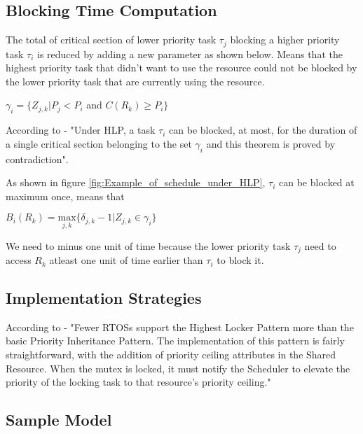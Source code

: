 \subsection{Blocking Time Computation}

The total of critical section of lower priority task $\tau_{j}$ blocking a higher priority task $\tau_{i}$ is reduced by adding a new parameter as shown below. Means that the highest priority task that didn't want to use the resource could not be blocked by the lower priority task that are currently using the resource.

\begin{center}
$ \gamma_{i}=\{Z_{j,k} | P_{j}<P_{i} $ and $ C(R_{k})\geq P_{i} \} $ \cite{b5}
\end{center}

According to \cite{b5} - "Under HLP, a task $ \tau_{i} $ can be blocked, at most, for the duration of a single critical section belonging to the set $ \gamma_{i} $ and this theorem is proved by contradiction".  

As shown in figure \ref{fig:Example_of_schedule_under_HLP}, $ \tau_{i} $ can be blocked at maximum once, means that

\begin{center}
$B_{i}(R_{k})=\underset{j,k}{\mathrm{max}} \{ \delta_{j,k}-1 | Z_{j,k} \in \gamma_{i}\}  $ \cite{b5}
\end{center}

We need to minus one unit of time because the lower priority task $ \tau_{j} $ need to access $ R_{k} $ atleast one unit of time earlier than $ \tau_{i} $ to block it.

\subsection{Implementation Strategies} 

According to \cite{b6} - "Fewer RTOSs support the Highest Locker Pattern more than the basic Priority Inheritance Pattern. The implementation of this pattern  is fairly straightforward, with the addition of priority ceiling attributes in the Shared Resource. When the mutex is locked, it must notify the Scheduler to elevate the priority of the locking task to that resource's priority ceiling."

\subsection{Sample Model} 

